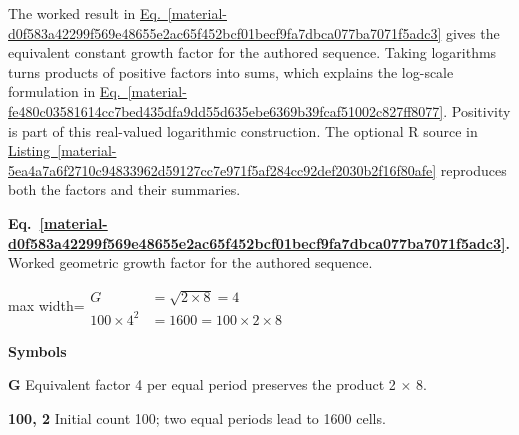 \documentclass[11pt,a4paper]{article}
\begin{document}
The worked result in \hyperref[material-d0f583a42299f569e48655e2ac65f452bcf01becf9fa7dbca077ba7071f5adc3]{Eq.~\ref*{material-d0f583a42299f569e48655e2ac65f452bcf01becf9fa7dbca077ba7071f5adc3}} gives the equivalent constant growth factor for the authored sequence. Taking logarithms turns products of positive factors into sums, which explains the log-scale formulation in \hyperref[material-fe480c03581614cc7bed435dfa9dd55d635ebe6369b39fcaf51002c827ff8077]{Eq.~\ref*{material-fe480c03581614cc7bed435dfa9dd55d635ebe6369b39fcaf51002c827ff8077}}. Positivity is part of this real-valued logarithmic construction. The optional R source in \hyperref[material-5ea4a7a6f2710c94833962d59127cc7e971f5af284cc92def2030b2f16f80afe]{Listing~\ref*{material-5ea4a7a6f2710c94833962d59127cc7e971f5af284cc92def2030b2f16f80afe}} reproduces both the factors and their summaries.


\par\medskip
\begin{samepage}
\label{material-d0f583a42299f569e48655e2ac65f452bcf01becf9fa7dbca077ba7071f5adc3}
\noindent\textbf{Eq.~\ref*{material-d0f583a42299f569e48655e2ac65f452bcf01becf9fa7dbca077ba7071f5adc3}.} Worked geometric growth factor for the authored sequence.\par\nopagebreak
\begin{center}\begin{adjustbox}{max width=\linewidth}$\displaystyle \begin{aligned}G&=\sqrt{2\times8}=4\\100\times4^2&=1600=100\times2\times8\end{aligned}$\end{adjustbox}\end{center}

\par\noindent\textbf{Symbols}

\par\noindent\textbf{G} Equivalent factor 4 per equal period preserves the product 2 \ensuremath{\times} 8.

\par\noindent\textbf{100, 2} Initial count 100; two equal periods lead to 1600 cells.

\end{samepage}
\medskip
\end{document}
